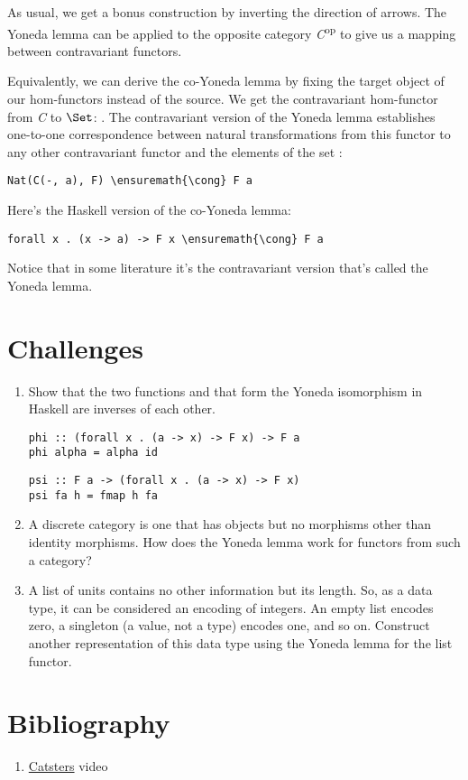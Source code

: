 As usual, we get a bonus construction by inverting the direction of
arrows. The Yoneda lemma can be applied to the opposite category
\emph{C}\textsuperscript{op} to give us a mapping between contravariant
functors.

Equivalently, we can derive the co-Yoneda lemma by fixing the target
object of our hom-functors instead of the source. We get the
contravariant hom-functor from \emph{C} to $\Set$:
. The contravariant version of the Yoneda lemma
establishes one-to-one correspondence between natural transformations
from this functor to any other contravariant functor  and the
elements of the set :

\begin{Verbatim}[commandchars=\\\{\}]
Nat(C(-, a), F) \ensuremath{\cong} F a
\end{Verbatim}
Here's the Haskell version of the co-Yoneda lemma:

\begin{Verbatim}[commandchars=\\\{\}]
forall x . (x -> a) -> F x \ensuremath{\cong} F a
\end{Verbatim}
Notice that in some literature it's the contravariant version that's
called the Yoneda lemma.

\section{Challenges}\label{challenges}

\begin{enumerate}
\tightlist
\item
  Show that the two functions  and  that form
  the Yoneda isomorphism in Haskell are inverses of each other.

\begin{Verbatim}[commandchars=\\\{\}]
phi :: (forall x . (a -> x) -> F x) -> F a
phi alpha = alpha id
\end{Verbatim}
\begin{Verbatim}[commandchars=\\\{\}]
psi :: F a -> (forall x . (a -> x) -> F x)
psi fa h = fmap h fa
\end{Verbatim}
\item
  A discrete category is one that has objects but no morphisms other
  than identity morphisms. How does the Yoneda lemma work for functors
  from such a category?
\item
  A list of units \code{{[}(){]}} contains no other information but
  its length. So, as a data type, it can be considered an encoding of
  integers. An empty list encodes zero, a singleton \code{{[}(){]}} (a
  value, not a type) encodes one, and so on. Construct another
  representation of this data type using the Yoneda lemma for the list
  functor.
\end{enumerate}

\section{Bibliography}\label{bibliography}

\begin{enumerate}
\tightlist
\item
  \href{https://www.youtube.com/watch?v=TLMxHB19khE}{Catsters} video
\end{enumerate}
